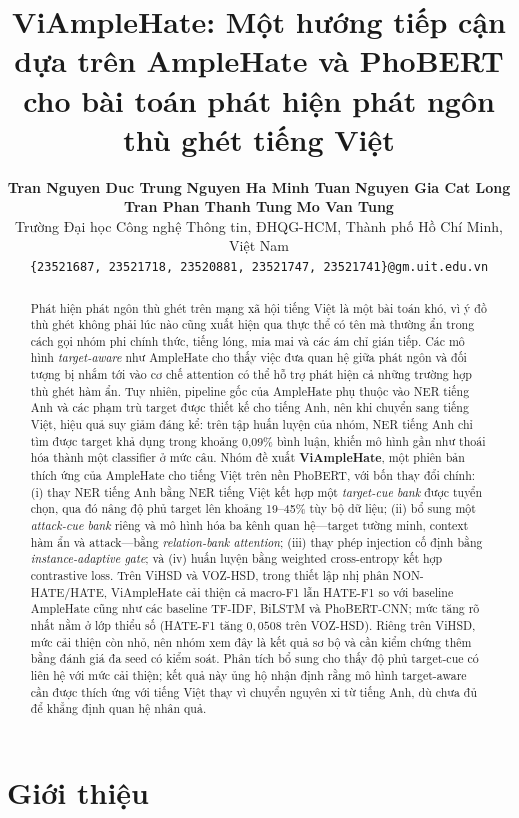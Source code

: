 \documentclass[11pt]{article}
\title{ViAmpleHate: Một hướng tiếp cận dựa trên AmpleHate và PhoBERT\\ cho bài toán phát hiện phát ngôn thù ghét tiếng Việt}
\author{
  \textbf{Tran Nguyen Duc Trung} \quad
  \textbf{Nguyen Ha Minh Tuan} \quad
  \textbf{Nguyen Gia Cat Long} \\
  \textbf{Tran Phan Thanh Tung} \quad
  \textbf{Mo Van Tung} \\[4pt]
  Trường Đại học Công nghệ Thông tin, ĐHQG-HCM, Thành phố Hồ Chí Minh, Việt Nam \\
  \texttt{\{23521687, 23521718, 23520881, 23521747, 23521741\}@gm.uit.edu.vn}
}
\begin{document}
\maketitle

\begin{abstract}
Phát hiện phát ngôn thù ghét trên mạng xã hội tiếng Việt là một bài toán khó, vì ý đồ thù ghét không phải lúc nào cũng xuất hiện qua thực thể có tên mà thường ẩn trong cách gọi nhóm phi chính thức, tiếng lóng, mỉa mai và các ám chỉ gián tiếp. Các mô hình \emph{target-aware} như AmpleHate cho thấy việc đưa quan hệ giữa phát ngôn và đối tượng bị nhắm tới vào cơ chế attention có thể hỗ trợ phát hiện cả những trường hợp thù ghét hàm ẩn. Tuy nhiên, pipeline gốc của AmpleHate phụ thuộc vào NER tiếng Anh và các phạm trù target được thiết kế cho tiếng Anh, nên khi chuyển sang tiếng Việt, hiệu quả suy giảm đáng kể: trên tập huấn luyện của nhóm, NER tiếng Anh chỉ tìm được target khả dụng trong khoảng 0,09\% bình luận, khiến mô hình gần như thoái hóa thành một classifier ở mức câu.
Nhóm đề xuất \textbf{ViAmpleHate}, một phiên bản thích ứng của AmpleHate cho tiếng Việt trên nền PhoBERT, với bốn thay đổi chính: (i) thay NER tiếng Anh bằng NER tiếng Việt kết hợp một \emph{target-cue bank} được tuyển chọn, qua đó nâng độ phủ target lên khoảng 19--45\% tùy bộ dữ liệu; (ii) bổ sung một \emph{attack-cue bank} riêng và mô hình hóa ba kênh quan hệ---target tường minh, context hàm ẩn và attack---bằng \emph{relation-bank attention}; (iii) thay phép injection cố định bằng \emph{instance-adaptive gate}; và (iv) huấn luyện bằng weighted cross-entropy kết hợp contrastive loss.
Trên ViHSD và VOZ-HSD, trong thiết lập nhị phân NON-HATE/HATE, ViAmpleHate cải thiện cả macro-F1 lẫn HATE-F1 so với baseline AmpleHate cũng như các baseline TF-IDF, BiLSTM và PhoBERT-CNN; mức tăng rõ nhất nằm ở lớp thiểu số (HATE-F1 tăng $0{,}0508$ trên VOZ-HSD). Riêng trên ViHSD, mức cải thiện còn nhỏ, nên nhóm xem đây là kết quả sơ bộ và cần kiểm chứng thêm bằng đánh giá đa seed có kiểm soát. Phân tích bổ sung cho thấy độ phủ target-cue có liên hệ với mức cải thiện; kết quả này ủng hộ nhận định rằng mô hình target-aware cần được thích ứng với tiếng Việt thay vì chuyển nguyên xi từ tiếng Anh, dù chưa đủ để khẳng định quan hệ nhân quả.
\end{abstract}

\section{Giới thiệu}
\end{document}
